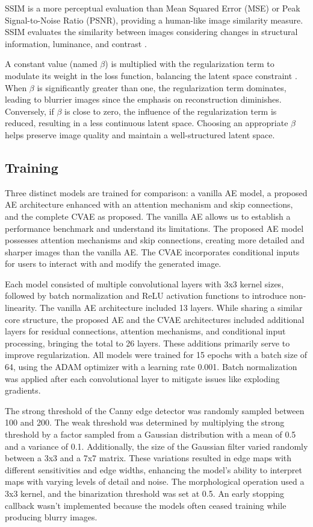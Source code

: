 \documentclass{IEEEcsmag}
\begin{document}
SSIM is a more perceptual evaluation than Mean Squared Error (MSE) or Peak Signal-to-Noise Ratio (PSNR), providing a human-like image similarity measure. SSIM evaluates the similarity between images considering changes in structural information, luminance, and contrast \cite{wang2004}.

A constant value (named $\beta$) is multiplied with the regularization term to modulate its weight in the loss function, balancing the latent space constraint \cite{higgins2022}. When $\beta$ is significantly greater than one, the regularization term dominates, leading to blurrier images since the emphasis on reconstruction diminishes. Conversely, if $\beta$ is close to zero, the influence of the regularization term is reduced, resulting in a less continuous latent space. Choosing an appropriate $\beta$ helps preserve image quality and maintain a well-structured latent space.

\subsection{Training}
\label{subsec:training}

Three distinct models are trained for comparison: a vanilla AE model, a proposed AE architecture enhanced with an attention mechanism and skip connections, and the complete CVAE as proposed. The vanilla AE allows us to establish a performance benchmark and understand its limitations. The proposed AE model possesses attention mechanisms and skip connections, creating more detailed and sharper images than the vanilla AE. The CVAE incorporates conditional inputs for users to interact with and modify the generated image.

Each model consisted of multiple convolutional layers with 3x3 kernel sizes, followed by batch normalization and ReLU activation functions to introduce non-linearity. The vanilla AE architecture included 13 layers. While sharing a similar core structure, the proposed AE and the CVAE architectures included additional layers for residual connections, attention mechanisms, and conditional input processing, bringing the total to 26 layers. These additions primarily serve to improve regularization. All models were trained for 15 epochs with a batch size of 64, using the ADAM optimizer with a learning rate 0.001. Batch normalization was applied after each convolutional layer to mitigate issues like exploding gradients.

The strong threshold of the Canny edge detector was randomly sampled between 100 and 200. The weak threshold was determined by multiplying the strong threshold by a factor sampled from a Gaussian distribution with a mean of 0.5 and a variance of 0.1. Additionally, the size of the Gaussian filter varied randomly between a 3x3 and a 7x7 matrix. These variations resulted in edge maps with different sensitivities and edge widths, enhancing the model's ability to interpret maps with varying levels of detail and noise. The morphological operation used a 3x3 kernel, and the binarization threshold was set at 0.5. An early stopping callback wasn't implemented because the models often ceased training while producing blurry images.
\end{document}
